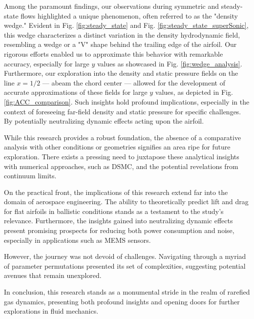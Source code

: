 Among the paramount findings, our observations during symmetric and steady-state flows highlighted a unique phenomenon, often referred to as the "density wedge." Evident in Fig. \ref{fig:steady_state} and Fig. \ref{fig:steady_state_superSonic}, this wedge characterizes a distinct variation in the density hydrodynamic field, resembling a wedge or a "V" shape behind the trailing edge of the airfoil. Our rigorous efforts enabled us to approximate this behavior with remarkable accuracy, especially for large $y$ values as showcased in Fig. \ref{fig:wedge_analysis}. 
Furthermore, our exploration into the density and static pressure fields on the line $x=1/2$ — abeam the chord center — allowed for the development of accurate approximations of these fields for large $y$ values, as depicted in Fig. \ref{fig:ACC_comparison}. 
Such insights hold profound implications, especially in the context of foreseeing far-field density and static pressure for specific challenges. By potentially neutralizing dynamic effects acting upon the airfoil.

While this research provides a robust foundation, the absence of a comparative analysis with other conditions or geometries signifies an area ripe for future exploration. There exists a pressing need to juxtapose these analytical insights with numerical approaches, such as DSMC, and the potential revelations from continuum limits.

On the practical front, the implications of this research extend far into the domain of aerospace engineering. The ability to theoretically predict lift and drag for flat airfoils in ballistic conditions stands as a testament to the study's relevance. Furthermore, the insights gained into neutralizing dynamic effects present promising prospects for reducing both power consumption and noise, especially in applications such as MEMS sensors.

However, the journey was not devoid of challenges. Navigating through a myriad of parameter permutations presented its set of complexities, suggesting potential avenues that remain unexplored.

In conclusion, this research stands as a monumental stride in the realm of rarefied gas dynamics, presenting both profound insights and opening doors for further explorations in fluid mechanics.